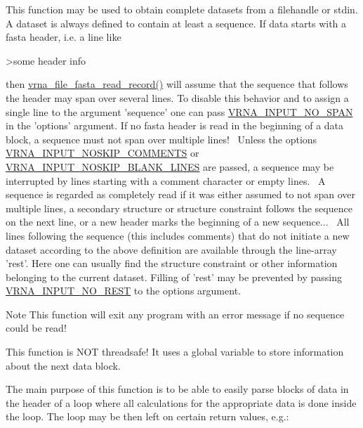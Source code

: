 This function may be used to obtain complete datasets from a filehandle or stdin. A dataset is always defined to contain at least a sequence. If data starts with a fasta header, i.\+e. a line like \begin{DoxyVerb}>some header info \end{DoxyVerb}
 then \hyperlink{group__file__utils_ga8cfb7e271efc9e1f34640acb85475639}{vrna\+\_\+file\+\_\+fasta\+\_\+read\+\_\+record()} will assume that the sequence that follows the header may span over several lines. To disable this behavior and to assign a single line to the argument 'sequence' one can pass \hyperlink{group__utils_ga0de536599b881c787b0943a2671da476}{V\+R\+N\+A\+\_\+\+I\+N\+P\+U\+T\+\_\+\+N\+O\+\_\+\+S\+P\+A\+N} in the 'options' argument. If no fasta header is read in the beginning of a data block, a sequence must not span over multiple lines!~\newline
 Unless the options \hyperlink{group__utils_ga0f6311f11bed1842e3a527ab27b294c6}{V\+R\+N\+A\+\_\+\+I\+N\+P\+U\+T\+\_\+\+N\+O\+S\+K\+I\+P\+\_\+\+C\+O\+M\+M\+E\+N\+T\+S} or \hyperlink{group__utils_gab4db885222b3b69608310d7c7e63e286}{V\+R\+N\+A\+\_\+\+I\+N\+P\+U\+T\+\_\+\+N\+O\+S\+K\+I\+P\+\_\+\+B\+L\+A\+N\+K\+\_\+\+L\+I\+N\+E\+S} are passed, a sequence may be interrupted by lines starting with a comment character or empty lines.~\newline
 A sequence is regarded as completely read if it was either assumed to not span over multiple lines, a secondary structure or structure constraint follows the sequence on the next line, or a new header marks the beginning of a new sequence...~\newline
 All lines following the sequence (this includes comments) that do not initiate a new dataset according to the above definition are available through the line-\/array 'rest'. Here one can usually find the structure constraint or other information belonging to the current dataset. Filling of 'rest' may be prevented by passing \hyperlink{group__utils_ga7a2e8c50a0c7ce82e60da1016e1367fd}{V\+R\+N\+A\+\_\+\+I\+N\+P\+U\+T\+\_\+\+N\+O\+\_\+\+R\+E\+S\+T} to the options argument.~\newline
 \begin{DoxyNote}{Note}
This function will exit any program with an error message if no sequence could be read! 

This function is N\+O\+T threadsafe! It uses a global variable to store information about the next data block.
\end{DoxyNote}
The main purpose of this function is to be able to easily parse blocks of data in the header of a loop where all calculations for the appropriate data is done inside the loop. The loop may be then left on certain return values, e.\+g.\+: 
